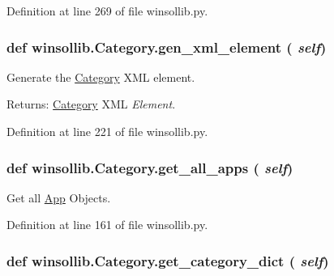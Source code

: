 Definition at line 269 of file winsollib.py.\hypertarget{classwinsollib_1_1Category_e69f0248b9a714ee7ada3b1fd7d3c40f}{
\subsubsection[gen\_\-xml\_\-element]{\setlength{\rightskip}{0pt plus 5cm}def winsollib.Category.gen\_\-xml\_\-element ( {\em self})}}
\label{classwinsollib_1_1Category_e69f0248b9a714ee7ada3b1fd7d3c40f}


Generate the \hyperlink{classwinsollib_1_1Category}{Category} XML element. 

\begin{Desc}
\item[Returns:]\hyperlink{classwinsollib_1_1Category}{Category} XML {\em Element\/}. \end{Desc}


Definition at line 221 of file winsollib.py.\hypertarget{classwinsollib_1_1Category_c3fa9263851ab098c5b2fcdde42c886c}{
\subsubsection[get\_\-all\_\-apps]{\setlength{\rightskip}{0pt plus 5cm}def winsollib.Category.get\_\-all\_\-apps ( {\em self})}}
\label{classwinsollib_1_1Category_c3fa9263851ab098c5b2fcdde42c886c}


Get all \hyperlink{classwinsollib_1_1App}{App} Objects. 



Definition at line 161 of file winsollib.py.\hypertarget{classwinsollib_1_1Category_7a5e18b9050c6cc633496042e7d2e10a}{
\subsubsection[get\_\-category\_\-dict]{\setlength{\rightskip}{0pt plus 5cm}def winsollib.Category.get\_\-category\_\-dict ( {\em self})}}
\label{classwinsollib_1_1Category_7a5e18b9050c6cc633496042e7d2e10a}


